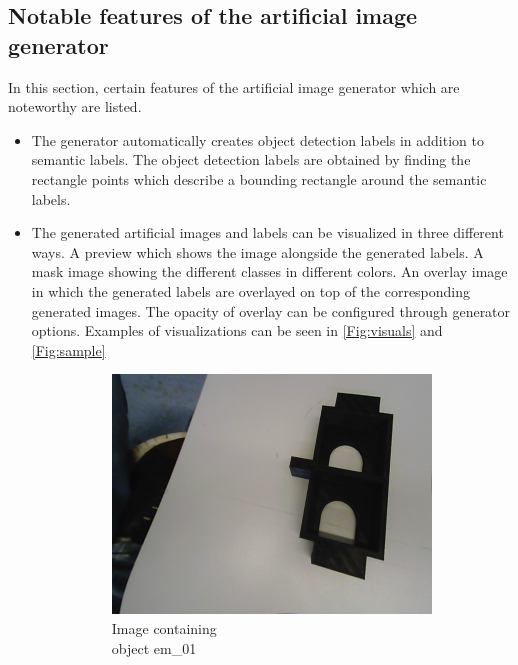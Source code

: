 	
\subsection{Notable features of the artificial image generator}
In this section, certain features of the artificial image generator which are noteworthy are listed.
	\begin{itemize}
		\item The generator automatically creates object detection labels in addition to semantic labels. The object detection labels are obtained by finding the rectangle points which describe a bounding rectangle around the semantic labels.
		\item The generated artificial images and labels can be visualized in three different ways. A preview which shows the image alongside the generated labels. A mask image showing the different classes in different colors. An overlay image in which the generated labels are overlayed on top of the corresponding generated images. The opacity of overlay can be configured through generator options. Examples of visualizations can be seen in \ref{Fig:visuals} and \ref{Fig:sample}
		\begin{figure}[!htb]
			\centering
			\begin{subfigure}{.3\textwidth}
  				\centering
  				\includegraphics[width=.9\linewidth]{images/eg_image}
  				\caption{Image containing \\object em\_01}
  				\label{Fig:visualsa}
			\end{subfigure}%
			\begin{subfigure}{.3\textwidth}
  				\centering

\end{subfigure}
\end{figure}
\end{itemize}
